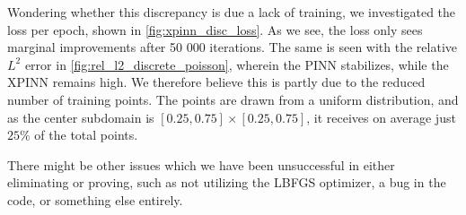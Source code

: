 Wondering whether this discrepancy is due a lack of training, we investigated the loss per epoch, shown in \autoref{fig:xpinn_disc_loss}.
As we see, the loss only sees marginal improvements after 50 000 iterations.
The same is seen with the relative $L^2$ error in \autoref{fig:rel_l2_discrete_poisson}, wherein the PINN stabilizes, while the XPINN remains high.
We therefore believe this is partly due to the reduced number of training points.
The points are drawn from a uniform distribution, and as the center subdomain is $[0.25, 0.75] \times [0.25, 0.75]$, it receives on average just $25\%$ of the total points.

There might be other issues which we have been unsuccessful in either eliminating or proving, such as not utilizing the LBFGS optimizer, a bug in the code, or something else entirely.

